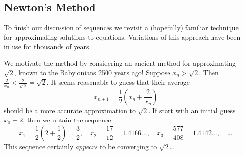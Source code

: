 \clearpage


\subsection{Newton's Method}

To finish our discussion of sequences we revisit a (hopefully) familiar technique for approximating solutions to equations. Variations of this approach have been in use for thousands of years.


\begin{example}{}{}
	We motivate the method by considering an ancient method for approximating $\sqrt 2$, known to the Babylonians 2500 years ago!\smallbreak
	Suppose $x_n>\sqrt 2$. Then $\frac 2{x_n}<\frac 2{\sqrt 2}=\sqrt 2$. It seems reasonable to guess that their average
	\[
		x_{n+1}=\frac 12\left(x_n+\frac 2{x_n}\right)
	\]
	should be a more accurate approximation to $\sqrt 2$. If start with an initial guess $x_0=2$, then we obtain the sequence
	\[
		x_1=\frac 12\left(2+\frac 12\right)=\frac 32,\quad x_2=\frac{17}{12} =1.4166\ldots,\quad x_3=\frac{577}{408}=1.4142\ldots,\quad \ldots
	\]
	This sequence certainly \emph{appears} to be converging to $\sqrt 2$\ldots
\end{example}


